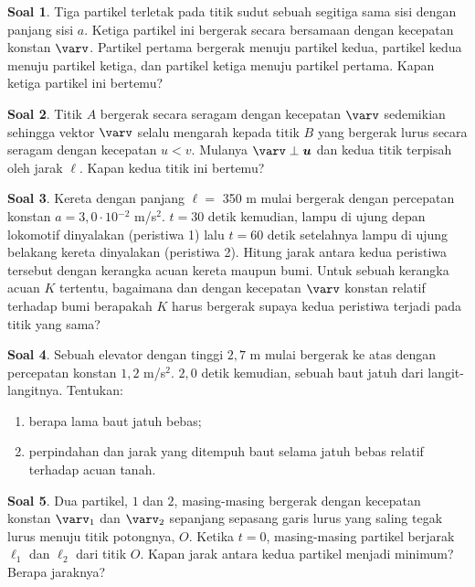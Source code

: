 \documentclass[a4paper, 11.5pt]{article}
\theoremstyle{definition}
\newtheorem{soal}{Soal}
\begin{document}
\begin{soal}
	Tiga partikel terletak pada titik sudut sebuah segitiga sama sisi dengan panjang sisi $a$. Ketiga partikel ini bergerak secara bersamaan dengan kecepatan konstan $\varv$. Partikel pertama bergerak menuju partikel kedua, partikel kedua menuju partikel ketiga, dan partikel ketiga menuju partikel pertama. Kapan ketiga partikel ini bertemu?
\end{soal}

\begin{soal}
	Titik $A$ bergerak secara seragam dengan kecepatan $\varv$ sedemikian sehingga vektor $\boldsymbol{\varv}$ selalu mengarah kepada titik $B$ yang bergerak lurus secara seragam dengan kecepatan $u < v$. Mulanya $\boldsymbol{\varv} \perp \boldsymbol{u}$ dan kedua titik terpisah oleh jarak $\ell$. Kapan kedua titik ini bertemu?
\end{soal}

\begin{soal}
	Kereta dengan panjang $\ell =$ 350 m mulai bergerak dengan percepatan konstan $a = 3{,}0 \cdot 10{}^{-2}$ m/s$^2$. $t = 30$ detik kemudian, lampu di ujung depan lokomotif dinyalakan (peristiwa 1) lalu $t = 60$ detik setelahnya lampu di ujung belakang kereta dinyalakan (peristiwa 2). Hitung jarak antara kedua peristiwa tersebut dengan kerangka acuan kereta maupun bumi. Untuk sebuah kerangka acuan $K$ tertentu, bagaimana dan dengan kecepatan $\varv$ konstan relatif terhadap bumi berapakah $K$ harus bergerak supaya kedua peristiwa terjadi pada titik yang sama?
\end{soal}

\begin{soal}
	Sebuah elevator dengan tinggi $2{,}7$ m mulai bergerak ke atas dengan percepatan konstan $1{,}2$ m/s$^2$. $2{,}0$ detik kemudian, sebuah baut jatuh dari langit-langitnya. Tentukan:
	
	\begin{enumerate}[label=(\alph*)]
		\item berapa lama baut jatuh bebas;
		\item perpindahan dan jarak yang ditempuh baut selama jatuh bebas relatif terhadap acuan tanah.
	\end{enumerate}
\end{soal}

\begin{soal}
	Dua partikel, $1$ dan $2$, masing-masing bergerak dengan kecepatan konstan $\varv_1$ dan $\varv_2$ sepanjang sepasang garis lurus yang saling tegak lurus menuju titik potongnya, $O$. Ketika $t = 0$, masing-masing partikel berjarak $\ell_1$ dan $\ell_2$ dari titik $O$. Kapan jarak antara kedua partikel menjadi minimum? Berapa jaraknya?
\end{soal}
\end{document}
